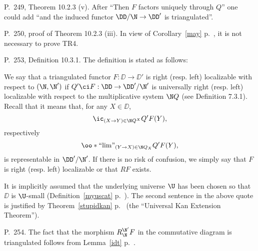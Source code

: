\documentclass[12pt]{article}
\theoremstyle{remark}
\theoremstyle{definition}
\begin{document}
\begin{s} 
P.~249, Theorem 10.2.3 (v). After ``Then $F$ factors uniquely through $Q$'' one could add ``and the induced functor $\DD/\N\to\DD'$ is triangulated''.
\end{s}


\begin{s} 
P.~250, proof of Theorem 10.2.3 (iii). In view of Corollary~\ref{may} p.~, it is not necessary to prove TR4.
\end{s}




\begin{s}
P.~253, Definition 10.3.1. The definition is stated as follows: 

We say that a triangulated functor $F:\DD\to\DD'$ is right (resp. left) localizable with respect to $(\N,\N')$ if $Q'\ci F:\DD\to\DD'/\N'$ is universally right (resp. left) localizable with respect to the multiplicative system $\N Q$ (see Definition 7.3.1). Recall that it means that, for any $X\in\DD$, 
$$
\ic_{(X\to Y)\in\N Q^X}Q'F(Y),
$$ 
respectively 
$$
\oo*{``\!\lim\!"}_{(Y\to X)\in\N Q_X}Q'F(Y),
$$ 
is representable in $\DD'/\N'$. If there is no risk of confusion, we simply say that $F$ is right (resp. left) localizable or that $RF$ exists.

It is implicitly assumed that the underlying universe $\U$ has been chosen so that $\DD$ is $\U$-small (Definition~\ref{myuscat} p.~). The second sentence in the above quote is justified by Theorem~\ref{stupidkan} p.~ (the ``Universal Kan Extension Theorem''). 
\end{s}

%

\begin{s}
P.~254. The fact that the morphism $R^{\N'}_\N F$ in the commutative diagram is triangulated follows from Lemma~\ref{idt} p.~.
\end{s}
\end{document}
